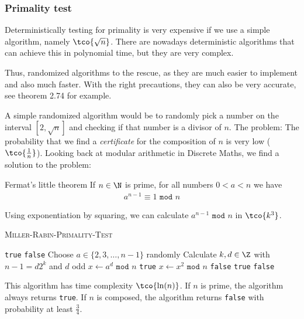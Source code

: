 \subsubsection{Primality test}
Deterministically testing for primality is very expensive if we use a simple algorithm, namely $\tco{\sqrt{n}}$. There are nowadays deterministic algorithms that can achieve this in polynomial time, but they are very complex.

Thus, randomized algorithms to the rescue, as they are much easier to implement and also much faster. With the right precautions, they can also be very accurate, see theorem 2.74 for example.

A simple randomized algorithm would be to randomly pick a number on the interval $[2, \sqrt{n}]$ and checking if that number is a divisor of $n$. 
The problem: The probability that we find a \textit{certificate} for the composition of $n$ is very low ($\tco{\frac{1}{n}}$). Looking back at modular arithmetic in Discrete Maths, we find a solution to the problem:

\begin{theorem}[]{Fermat's little theorem}
    If $n \in \N$ is prime, for all numbers $0 < a < n$ we have
    \begin{align*}
        a^{n - 1} \equiv 1 \texttt{ mod } n
    \end{align*}
\end{theorem}
Using exponentiation by squaring, we can calculate $a^{n - 1} \texttt{ mod } n$ in $\tco{k^3}$.

\begin{algorithm}
    \caption{\textsc{Miller-Rabin-Primality-Test}}\label{alg:miller-rabin-primality-test}
    \begin{algorithmic}[1]
                \State \Return \texttt{true}
                \State \Return \texttt{false}
            \EndIf
            \State Choose $a \in \{2, 3, \ldots, n - 1\}$ randomly
            \State Calculate $k, d \in \Z$ with $n - 1 = d2^k$ and $d$ odd 
            \State $x \gets a^d \texttt{ mod } n$
                \State \Return \texttt{true}
            \EndIf
             
                \State $x \gets x^2 \texttt{ mod } n$
                    \State \Return \texttt{false}
                \EndIf
                    \State \Return \texttt{true}
                \EndIf
            \EndWhile
            \State \Return \texttt{false}
        \EndProcedure
    \end{algorithmic}
\end{algorithm}
This algorithm has time complexity $\tco{\ln(n)}$. If $n$ is prime, the algorithm always returns \texttt{true}. If $n$ is composed, the algorithm returns \texttt{false} with probability at least $\frac{3}{4}$.

